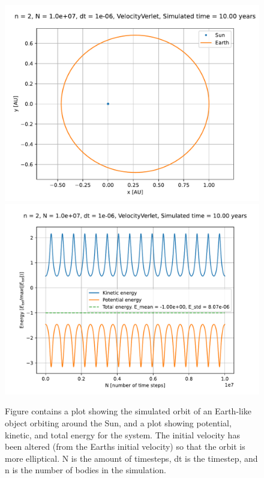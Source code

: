 \documentclass[reprint,english,notitlepage]{revtex4-1}  %
\begin{document}
\begin{figure}[H]
\includegraphics[scale=0.5]{../data/figures/varyingbeta/se_peturbed_beta2_vv_orbits2D.pdf}
\includegraphics[scale=0.5]{../data/figures/varyingbeta/se_peturbed_beta2_vv_energy.pdf}
\caption{Figure contains a plot showing the simulated orbit of an Earth-like object orbiting around the Sun, and a plot showing potential, kinetic, and total energy for the system. The initial velocity has been altered (from the Earths initial velocity) so that the orbit is more elliptical. N is the amount of timesteps, dt is the timestep, and n is the number of bodies in the simulation.}
\label{fig:beta2_peturbed}
\end{figure}
\end{document}
